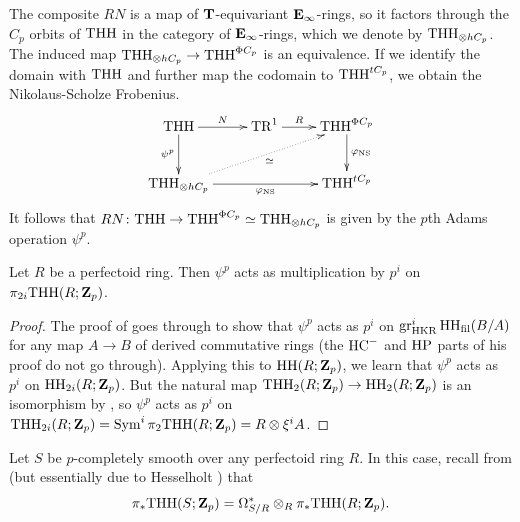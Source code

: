 \begin{remark}
  The composite $RN$ is a map of $\mathbf T$-equivariant $\mathbf E_\infty$-rings, so it factors through the $C_p$ orbits of $\mathrm{THH}$ in the category of $\mathbf E_\infty$-rings, which we denote by $\mathrm{THH}_{\otimes hC_p}$. The induced map $\mathrm{THH}_{\otimes hC_p} \to \mathrm{THH}^{\Phi C_p}$ is an equivalence. If we identify the domain with $\mathrm{THH}$ and further map the codomain to $\mathrm{THH}^{tC_p}$, we obtain the Nikolaus-Scholze Frobenius.
  \[\xymatrix{
      \THH \ar[r]^-N \ar[d]_-{\psi^p} & \TR^1 \ar[r]^-R & \THH^{\Phi C_p} \ar[d]^-{\varphi_{\mathrm{NS}}}\\
      \THH_{\tnsr hC_p} \ar@{..>}[urr]_-\simeq \ar[rr]_-{\varphi_{\mathrm{NS}}} && \THH^{tC_p}
  }\]
  It follows that $RN\colon \mathrm{THH} \to \mathrm{THH}^{\Phi C_p} \simeq \mathrm{THH}_{\otimes hC_p}$ is given by the $p$th Adams operation $\psi^p$.
\end{remark}


\begin{lemma}
  \label{lem:adams-perfd}
  Let $R$ be a perfectoid ring. Then $\psi^p$ acts as multiplication by $p^i$ on $\pi_{2i}\mathrm{THH}(R;\mathbf Z_p)$.
\end{lemma}
\begin{proof}
  The proof of \cite[Proposition 6.4.12]{RaksitDDR} goes through to show that $\psi^p$ acts as $p^i$ on $\operatorname{gr}^i_{\mathrm{HKR}} \mathrm{HH}_{\operatorname{fil}}(B/A)$ for any map $A\to B$ of derived commutative rings (the $\mathrm{HC}^-$ and $\mathrm{HP}$ parts of his proof do not go through). Applying this to $\mathrm{HH}(R;\mathbf Z_p)$, we learn that $\psi^p$ acts as $p^i$ on $\mathrm{HH}_{2i}(R;\mathbf Z_p)$. But the natural map $\mathrm{THH}_2(R;\mathbf Z_p) \to \mathrm{HH}_2(R;\mathbf Z_p)$ is an isomorphism by \cite[Proposition IV.4.2]{NikolausScholze}, so $\psi^p$ acts as $p^i$ on $\mathrm{THH}_{2i}(R;\mathbf Z_p) = \operatorname{Sym}^i \pi_2 \mathrm{THH}(R;\mathbf Z_p) = R\otimes \xi^i A$.
\end{proof}

Let $S$ be $p$-completely smooth over any perfectoid ring $R$. In this case, recall from \cite[Corollary 6.9]{BMS2} (but essentially due to Hesselholt \cite{LarsPTyp}) that
\[ \pi_* \mathrm{THH}(S;\mathbf Z_p) = \Omega^*_{S/R} \otimes_R \pi_*\mathrm{THH}(R;\mathbf Z_p). \]

